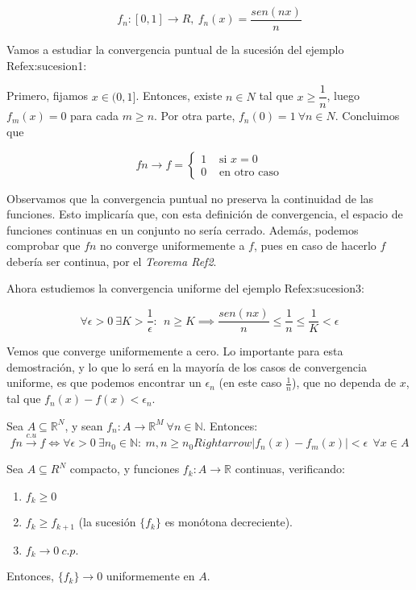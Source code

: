 \begin{ejemplo} \label{ex:sucesion3}
  \[
    f_n : [0,1] \to R,\ f_n(x) = \dfrac{sen(nx)}{n}
  \]
\end{ejemplo}

Vamos a estudiar la convergencia puntual de la sucesión del ejemplo Ref{ex:sucesion1}:

Primero, fijamos $x\in (0,1]$. Entonces, existe $n\in N$ tal que $x \ge \dfrac{1}{n}$, luego $f_m(x) = 0$ para cada $m\ge n$. Por otra parte, $f_n(0) = 1\ \forall n\in N$. Concluimos que

\[
  fn\to f = \begin{cases}
    1 & \text{ si } x=0\\
    0 & \text{ en otro caso}
  \end{cases}
\]

Observamos que la convergencia puntual no preserva la continuidad de las funciones. Esto implicaría que, con esta definición de convergencia, el espacio de funciones continuas en un conjunto no sería cerrado. Además, podemos comprobar que $fn$ no converge uniformemente a $f$, pues en caso de hacerlo $f$ debería ser continua, por el \textit{Teorema Ref{2}}.

Ahora estudiemos la convergencia uniforme del ejemplo Ref{ex:sucesion3}:

\[
  \forall\epsilon>0\ \exists K>\dfrac{1}{\epsilon}:\ \ n\ge K \implies \dfrac{sen(nx)}{n} \le \dfrac{1}{n} \le \dfrac{1}{K} < \epsilon
\]

Vemos que converge uniformemente a cero. Lo importante para esta demostración, y lo que lo será en la mayoría de los casos de convergencia uniforme, es que podemos encontrar un $\epsilon_n$ (en este caso $\frac{1}{n}$), que no dependa de $x$, tal que $f_n(x)-f(x) < \epsilon_n$.

\begin{nprop}
  Sea $A \subseteq \mathbb{R}^N$, y sean $f_n: A \longrightarrow \mathbb{R}^M \ \forall n \in \mathbb{N}$. Entonces: $$fn \xrightarrow {c.u} f \iff \forall \epsilon > 0\ \exists n_0 \in \mathbb{N}:\ m,n \ge n_0 Rightarrow |f_n(x) - f_m(x)| < \epsilon\ \ \forall x \in A$$
\end{nprop}

  
\begin{nth}[de Dini]
  \label{1}
  Sea $A\subseteq R^N$ compacto, y funciones $f_k : A \to \mathbb{R}$ continuas, verificando:

  \begin{enumerate}
  \item $f_k \geq 0$
  \item $f_k \geq f_{k+1}$ (la sucesión $\{f_k\}$ es monótona decreciente).
  \item $f_k \to 0\ c.p.$
  \end{enumerate}

  Entonces, $\{f_k\} \to 0$ uniformemente en $A$.
\end{nth}

